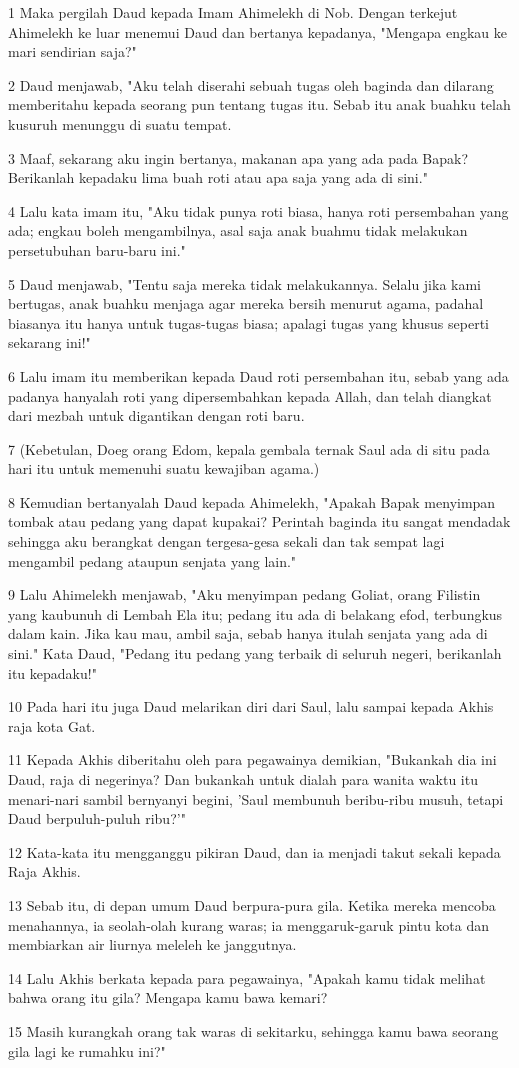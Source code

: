 \par 1 Maka pergilah Daud kepada Imam Ahimelekh di Nob. Dengan terkejut Ahimelekh ke luar menemui Daud dan bertanya kepadanya, "Mengapa engkau ke mari sendirian saja?"
\par 2 Daud menjawab, "Aku telah diserahi sebuah tugas oleh baginda dan dilarang memberitahu kepada seorang pun tentang tugas itu. Sebab itu anak buahku telah kusuruh menunggu di suatu tempat.
\par 3 Maaf, sekarang aku ingin bertanya, makanan apa yang ada pada Bapak? Berikanlah kepadaku lima buah roti atau apa saja yang ada di sini."
\par 4 Lalu kata imam itu, "Aku tidak punya roti biasa, hanya roti persembahan yang ada; engkau boleh mengambilnya, asal saja anak buahmu tidak melakukan persetubuhan baru-baru ini."
\par 5 Daud menjawab, "Tentu saja mereka tidak melakukannya. Selalu jika kami bertugas, anak buahku menjaga agar mereka bersih menurut agama, padahal biasanya itu hanya untuk tugas-tugas biasa; apalagi tugas yang khusus seperti sekarang ini!"
\par 6 Lalu imam itu memberikan kepada Daud roti persembahan itu, sebab yang ada padanya hanyalah roti yang dipersembahkan kepada Allah, dan telah diangkat dari mezbah untuk digantikan dengan roti baru.
\par 7 (Kebetulan, Doeg orang Edom, kepala gembala ternak Saul ada di situ pada hari itu untuk memenuhi suatu kewajiban agama.)
\par 8 Kemudian bertanyalah Daud kepada Ahimelekh, "Apakah Bapak menyimpan tombak atau pedang yang dapat kupakai? Perintah baginda itu sangat mendadak sehingga aku berangkat dengan tergesa-gesa sekali dan tak sempat lagi mengambil pedang ataupun senjata yang lain."
\par 9 Lalu Ahimelekh menjawab, "Aku menyimpan pedang Goliat, orang Filistin yang kaubunuh di Lembah Ela itu; pedang itu ada di belakang efod, terbungkus dalam kain. Jika kau mau, ambil saja, sebab hanya itulah senjata yang ada di sini." Kata Daud, "Pedang itu pedang yang terbaik di seluruh negeri, berikanlah itu kepadaku!"
\par 10 Pada hari itu juga Daud melarikan diri dari Saul, lalu sampai kepada Akhis raja kota Gat.
\par 11 Kepada Akhis diberitahu oleh para pegawainya demikian, "Bukankah dia ini Daud, raja di negerinya? Dan bukankah untuk dialah para wanita waktu itu menari-nari sambil bernyanyi begini, 'Saul membunuh beribu-ribu musuh, tetapi Daud berpuluh-puluh ribu?'"
\par 12 Kata-kata itu mengganggu pikiran Daud, dan ia menjadi takut sekali kepada Raja Akhis.
\par 13 Sebab itu, di depan umum Daud berpura-pura gila. Ketika mereka mencoba menahannya, ia seolah-olah kurang waras; ia menggaruk-garuk pintu kota dan membiarkan air liurnya meleleh ke janggutnya.
\par 14 Lalu Akhis berkata kepada para pegawainya, "Apakah kamu tidak melihat bahwa orang itu gila? Mengapa kamu bawa kemari?
\par 15 Masih kurangkah orang tak waras di sekitarku, sehingga kamu bawa seorang gila lagi ke rumahku ini?"

